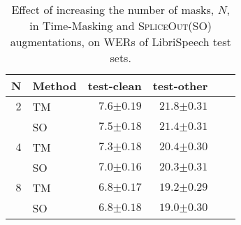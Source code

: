 \documentclass{article}
\newcommand{\SpA}{{\textsc{SpliceOut}}\xspace}
\begin{document}
\begin{table}
    \centering
    \caption{Effect of increasing the number of masks, $N$, in Time-Masking and \SpA (SO) augmentations, on WERs of LibriSpeech test sets.}
    \begin{tabular}{rlrrrr}
    \toprule
    N & Method & test-clean & test-other\\
    \midrule
    $2$ & TM & $7.6 {\scriptstyle \pm 0.19}$ & $21.8{\scriptstyle \pm 0.31}$\\
    & SO & $\mathbf{7.5}{\scriptstyle \pm 0.18}$ &  $\mathbf{21.4}{\scriptstyle \pm 0.31}$\\
    \midrule
    $4$ & TM  & $7.3{\scriptstyle \pm 0.18}$  & $20.4{\scriptstyle \pm 0.30}$\\
    & SO & $\mathbf{7.0}{\scriptstyle \pm 0.16}$ & $\mathbf{20.3}{\scriptstyle \pm 0.31}$\\
    \midrule
    $8$ & TM & $\mathbf{6.8}{\scriptstyle \pm 0.17}$  & $19.2{\scriptstyle \pm 0.29}$\\
    & SO  & $\mathbf{6.8}{\scriptstyle \pm 0.18}$ & $\mathbf{19.0}{\scriptstyle \pm 0.30}$\\
    \bottomrule
    \end{tabular}
    \label{tab:librimasks}
\end{table}
\end{document}
